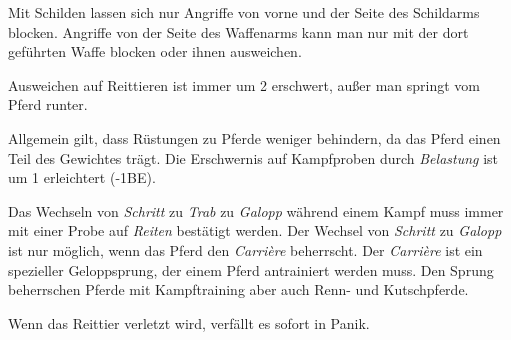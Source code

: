 Mit Schilden lassen sich nur Angriffe von vorne und der Seite des Schildarms blocken. Angriffe von der Seite des Waffenarms kann man nur mit der dort geführten Waffe blocken oder ihnen ausweichen.

Ausweichen auf Reittieren ist immer um 2 erschwert, außer man springt vom Pferd runter. 

Allgemein gilt, dass Rüstungen zu Pferde weniger behindern, da das Pferd einen Teil des Gewichtes trägt. Die Erschwernis auf Kampfproben durch \textit{Belastung} ist um 1 erleichtert (-1BE).

Das Wechseln von \textit{Schritt} zu \textit{Trab} zu \textit{Galopp} während einem Kampf muss immer mit einer Probe auf \textit{Reiten} bestätigt werden. Der Wechsel von \textit{Schritt} zu \textit{Galopp} ist nur möglich, wenn das Pferd den \textit{Carrière} beherrscht. Der \textit{Carrière} ist ein spezieller Geloppsprung, der einem Pferd antrainiert werden muss. Den Sprung beherrschen Pferde mit Kampftraining aber auch Renn- und Kutschpferde.

Wenn das Reittier verletzt wird, verfällt es sofort in Panik. 